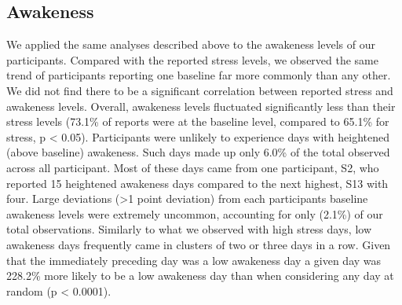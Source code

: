 \subsection{Awakeness}
We applied the same analyses described above to the  awakeness levels of our participants. Compared with the reported stress levels, we observed the same trend of participants reporting one baseline far more commonly than any other. We did not find there to be a significant correlation between reported stress and awakeness levels. Overall,  awakeness levels fluctuated significantly less than their stress levels (73.1\% of reports were at the baseline level, compared to 65.1\% for stress, p < 0.05). Participants were unlikely to experience days with heightened (above baseline) awakeness. Such days made up only 6.0\% of the total observed  across all participant. Most of these days came from one participant, S2, who reported 15 heightened awakeness days compared to the next highest, S13 with four. Large deviations (>1 point deviation) from each participants baseline awakeness levels were extremely uncommon, accounting for only  (2.1\%) of our total observations. Similarly to what we observed with high stress days, low awakeness days frequently came in clusters of two or three days in a row. Given that the immediately preceding day was a low awakeness day\rev{;} a given day was 228.2\% more likely to be a low awakeness day than when considering any day at random (p < 0.0001).


